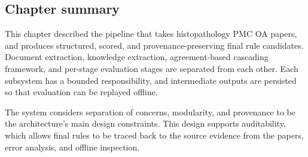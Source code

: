 \subsection{Chapter summary}

This chapter described the  pipeline that takes histopathology PMC OA papers, and produces structured, scored, and provenance-preserving final rule candidates. Document extraction, knowledge extraction, agreement-based cascading framework, and per-stage evaluation stages are separated from each other. Each subsystem has a bounded responsibility, and intermediate outputs are persisted so that evaluation can be replayed offline. 

The system considers separation of concerns, modularity, and provenance to be the architecture's main design constraints. This design supports auditability, which allows final rules to be traced back to the source evidence from the papers, error analysis, and offline inspection.

